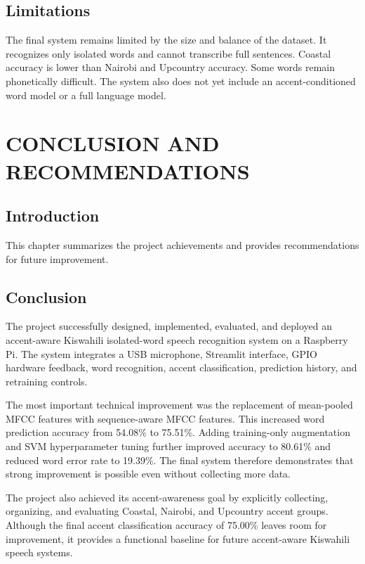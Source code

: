 \documentclass[12pt,a4paper]{report}
\begin{document}
\section{Limitations}
The final system remains limited by the size and balance of the dataset. It recognizes only isolated words and cannot transcribe full sentences. Coastal accuracy is lower than Nairobi and Upcountry accuracy. Some words remain phonetically difficult. The system also does not yet include an accent-conditioned word model or a full language model.

\chapter{CONCLUSION AND RECOMMENDATIONS}

\section{Introduction}
This chapter summarizes the project achievements and provides recommendations for future improvement.

\section{Conclusion}
The project successfully designed, implemented, evaluated, and deployed an accent-aware Kiswahili isolated-word speech recognition system on a Raspberry Pi. The system integrates a USB microphone, Streamlit interface, GPIO hardware feedback, word recognition, accent classification, prediction history, and retraining controls.

The most important technical improvement was the replacement of mean-pooled MFCC features with sequence-aware MFCC features. This increased word prediction accuracy from 54.08\% to 75.51\%. Adding training-only augmentation and SVM hyperparameter tuning further improved accuracy to 80.61\% and reduced word error rate to 19.39\%. The final system therefore demonstrates that strong improvement is possible even without collecting more data.

The project also achieved its accent-awareness goal by explicitly collecting, organizing, and evaluating Coastal, Nairobi, and Upcountry accent groups. Although the final accent classification accuracy of 75.00\% leaves room for improvement, it provides a functional baseline for future accent-aware Kiswahili speech systems.
\end{document}
